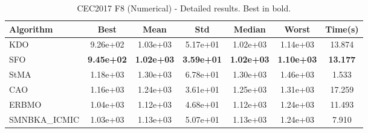 \begin{table}[H]
\centering\small
\caption{CEC2017 F8 (Numerical) - Detailed results. Best in bold.}
\label{tab:cec2017_F8}
\begin{tabular}{lcccccc}
\toprule
\textbf{Algorithm} & \textbf{Best} & \textbf{Mean} & \textbf{Std} & \textbf{Median} & \textbf{Worst} & \textbf{Time(s)} \\
\midrule
KDO & 9.26e+02 & 1.03e+03 & 5.17e+01 & 1.02e+03 & 1.14e+03 & 13.874 \\
SFO & \textbf{9.45e+02} & \textbf{1.02e+03} & \textbf{3.59e+01} & \textbf{1.02e+03} & \textbf{1.10e+03} & \textbf{13.177} \\
StMA & 1.18e+03 & 1.30e+03 & 6.78e+01 & 1.30e+03 & 1.46e+03 & 1.533 \\
CAO & 1.16e+03 & 1.24e+03 & 3.61e+01 & 1.25e+03 & 1.31e+03 & 17.259 \\
ERBMO & 1.04e+03 & 1.12e+03 & 4.68e+01 & 1.12e+03 & 1.24e+03 & 11.493 \\
SMNBKA_ICMIC & 1.03e+03 & 1.13e+03 & 5.07e+01 & 1.13e+03 & 1.24e+03 & 7.910 \\
\bottomrule
\end{tabular}
\end{table}
